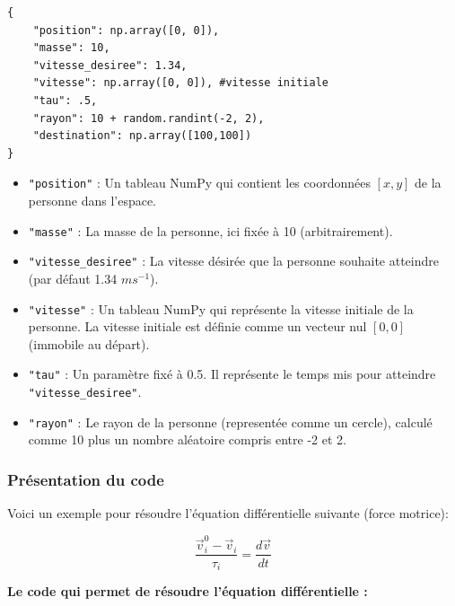 \documentclass[a4paper,12pt]{article}
\begin{document}
\begin{verbatim}
{
	"position": np.array([0, 0]),
	"masse": 10,
	"vitesse_desiree": 1.34, 
	"vitesse": np.array([0, 0]), #vitesse initiale
	"tau": .5,
	"rayon": 10 + random.randint(-2, 2),
	"destination": np.array([100,100])
} 
\end{verbatim}

\begin{itemize}
    \item \texttt{"position"} : Un tableau NumPy qui contient les coordonnées \([x, y]\) de la personne dans l'espace. 
    
    \item \texttt{"masse"} : La masse de la personne, ici fixée à 10 (arbitrairement).
    
    \item \texttt{"vitesse\_desiree"} : La vitesse désirée que la personne souhaite atteindre (par défaut 1.34 $ms^{-1}$).
    
    \item \texttt{"vitesse"} : Un tableau NumPy qui représente la vitesse initiale de la personne. La vitesse initiale est définie comme un vecteur nul \([0, 0]\) (immobile au départ).
    
    \item \texttt{"tau"} : Un paramètre fixé à 0.5. Il représente le temps mis pour atteindre \texttt{"vitesse\_desiree"}.
    
    \item \texttt{"rayon"} : Le rayon de la personne (representée comme un cercle), calculé comme 10 plus un nombre aléatoire compris entre -2 et 2. 
\end{itemize}

\subsubsection{Présentation du code}

Voici un exemple pour résoudre l'équation différentielle suivante (force motrice):

\begin{equation}
\frac{\vec{v}_i^0 - \vec{v}_i}{\tau_i} = \frac{d\vec{v}}{dt}
\end{equation}

\newpage

\textbf{Le code qui permet de résoudre l'équation différentielle :}
\end{document}
